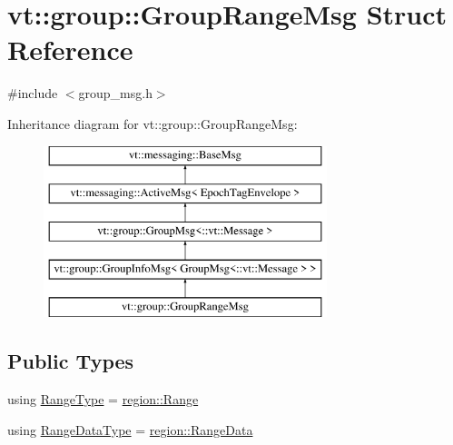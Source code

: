 \hypertarget{structvt_1_1group_1_1_group_range_msg}{}\section{vt\+:\+:group\+:\+:Group\+Range\+Msg Struct Reference}
\label{structvt_1_1group_1_1_group_range_msg}


{\ttfamily \#include $<$group\+\_\+msg.\+h$>$}

Inheritance diagram for vt\+:\+:group\+:\+:Group\+Range\+Msg\+:\begin{figure}[H]
\begin{center}
\leavevmode
\includegraphics[height=5.000000cm]{structvt_1_1group_1_1_group_range_msg}
\end{center}
\end{figure}
\subsection*{Public Types}
\begin{DoxyCompactItemize}
\item 
using \hyperlink{structvt_1_1group_1_1_group_range_msg_a49fdcbb2ae53a4c5778e60f306c8f5e6}{Range\+Type} = \hyperlink{structvt_1_1group_1_1region_1_1_range}{region\+::\+Range}
\item 
using \hyperlink{structvt_1_1group_1_1_group_range_msg_a893386277e3598ae990bea8245aee1f3}{Range\+Data\+Type} = \hyperlink{structvt_1_1group_1_1region_1_1_range_data}{region\+::\+Range\+Data}
\end{DoxyCompactItemize}
